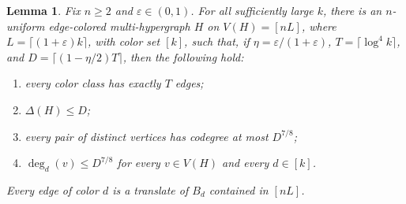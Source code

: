 \documentclass[10pt,a4paper]{amsart}
\numberwithin{equation}{section}
\newtheorem{lemma}[theorem]{Lemma}
\newcommand{\eps}{\varepsilon}
\begin{document}
\begin{lemma}\label{lem:sampling}
Fix $n\ge2$ and $\eps\in(0,1)$.  For all sufficiently large $k$, there is an
$n$-uniform edge-colored multi-hypergraph $H$ on $V(H)=[nL]$, where
$L=\lceil(1+\eps)k\rceil$, with color set $[k]$, such that, if
$\eta=\eps/(1+\eps)$, $T=\lceil\log^4 k\rceil$, and
$D=\lceil(1-\eta/2)T\rceil$, then the following hold:
\begin{enumerate}[label=\textup{(\roman*)},leftmargin=2.4em]
\item every color class has exactly $T$ edges;
\item $\Delta(H)\le D$;
\item every pair of distinct vertices has codegree at most $D^{7/8}$;
\item $\deg_d(v)\le D^{7/8}$ for every $v\in V(H)$ and every $d\in[k]$.
\end{enumerate}
Every edge of color $d$ is a translate of $B_d$ contained in $[nL]$.
\end{lemma}
\end{document}
